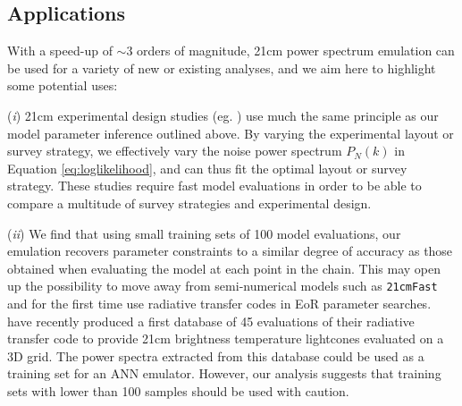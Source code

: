 \documentclass[useAMS,usenatbib]{mnras}
\begin{document}
\subsection{Applications}

With a speed-up of $\sim 3$ orders of magnitude, 21cm power spectrum emulation can be used for a variety of new or existing analyses, and we aim here to highlight some potential uses:

(\textit{i}) 21cm experimental design studies (eg. \cite{greig2015a}) use much the same principle as our model parameter inference outlined above. 
By varying the experimental layout or survey strategy, we effectively vary the noise power spectrum $P_N(k)$ in Equation \ref{eq:loglikelihood}, and can thus fit the optimal layout or survey strategy. 
These studies require fast model evaluations in order to be able to compare a multitude of survey strategies and experimental design. 

(\textit{ii}) We find that using small training sets of 100 model evaluations, our emulation recovers parameter constraints to a similar degree of accuracy as those obtained when evaluating the model at each point in the chain.
This may open up the possibility to move away from semi-numerical models such as \texttt{21cmFast} and for the first time use radiative transfer codes \citep{Ciardi2003,Iliev2006,baek2009,baek2010} in EoR parameter searches.
\citet{Semelin2017} have recently produced a first database of 45 evaluations of their radiative transfer code to provide 21cm brightness temperature lightcones evaluated on a 3D grid. 
The power spectra extracted from this database could be used as a training set for an ANN emulator. 
However, our analysis suggests that training sets with lower than 100 samples should be used with caution.
\end{document}
